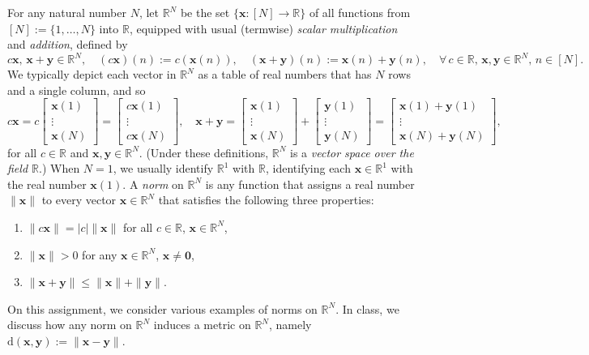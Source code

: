\documentclass[12 pt,letterpaper]{article}
\newcommand{\bbR}{\mathbb{R}}
\newcommand{\bfx}{\boldsymbol{x}}
\newcommand{\bfy}{\boldsymbol{y}}
\newcommand{\bfzero}{\boldsymbol{0}}
\newcommand{\rmd}{\mathrm{d}}
\newcommand{\mat}[2]{\left[\begin{array}{#1}#2\end{array}\right]}
\newcommand{\abs}[1]{|{#1}|}
\newcommand{\set}[1]{\{{#1}\}}
\newcommand{\bigset}[1]{\bigl\{{#1}\bigr\}}
\newcommand{\norm}[1]{\|{#1}\|}
\newcommand{\romani}{\renewcommand{\labelenumi}{(\roman{enumi})}}
\begin{document}
\noindent
For any natural number $N$,
let $\bbR^N$ be the set $\bigset{\bfx:[N]\rightarrow\bbR}$ of all functions from $[N]:=\set{1,\dotsc,N}$ into $\bbR$,
equipped with usual (termwise) \textit{scalar multiplication} and \textit{addition},
defined by
\begin{equation*}
c\bfx,\,\bfx+\bfy\in\bbR^N,
\quad
(c\bfx)(n):=c(\bfx(n)),
\quad
(\bfx+\bfy)(n):=\bfx(n)+\bfy(n),
\quad
\forall\,c\in\bbR,\,\bfx,\bfy\in\bbR^{N},\,n\in[N].
\end{equation*}
We typically depict each vector in $\bbR^N$ as a table of real numbers that has $N$ rows and a single column, and so
\begin{equation*}
c\bfx
=c\mat{c}{\bfx(1)\\\vdots\\\bfx(N)}
=\mat{c}{c\bfx(1)\\\vdots\\c\bfx(N)},
\quad
\bfx+\bfy
=\mat{c}{\bfx(1)\\\vdots\\\bfx(N)}+\mat{c}{\bfy(1)\\\vdots\\\bfy(N)}
=\mat{c}{\bfx(1)+\bfy(1)\\\vdots\\\bfx(N)+\bfy(N)},
\end{equation*}
for all $c\in\bbR$ and $\bfx,\bfy\in\bbR^N$.
(Under these definitions, $\bbR^N$ is a \textit{vector space over the field $\bbR$}.)
When $N=1$, we usually identify $\bbR^1$ with $\bbR$,
identifying each $\bfx\in\bbR^1$ with the real number $\bfx(1)$.
A \textit{norm} on $\bbR^N$ is any function that assigns a real number $\norm{\bfx}$ to every vector $\bfx\in\bbR^N$ that satisfies the following three properties:
\begin{enumerate}
\romani
\item
$\norm{c\bfx}=\abs{c}\norm{\bfx}$ for all $c\in\bbR$, $\bfx\in\bbR^N$,
\item
$\norm{\bfx}>0$ for any $\bfx\in\bbR^N$, $\bfx\neq\bfzero$,
\item
$\norm{\bfx+\bfy}\leq\norm{\bfx}+\norm{\bfy}$.
\end{enumerate}
On this assignment, we consider various examples of norms on $\bbR^N$.
In class, we discuss how any norm on $\bbR^N$ induces a metric on $\bbR^N$, namely $\rmd(\bfx,\bfy):=\norm{\bfx-\bfy}$.
\end{document}

